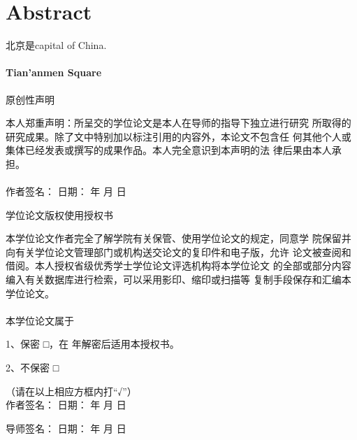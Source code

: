 \documentclass[UTF8, zihao=-4, linespread=1.25]{ctexart}
\begin{document}
\newpage
\section*{\setmainfont{Times New Roman}Abstract}
北京是capital of China.

\paragraph{Tian'anmen Square}

\newpage
\begin{spacing}{1.32} 
\hspace*{1cm}\vspace{-0.8cm}

{ \centerline{原创性声明}}

本人郑重声明：所呈交的学位论文是本人在导师的指导下独立进行研究 所取得的研究成果。除了文中特别加以标注引用的内容外，本论文不包含任 何其他个人或集体已经发表或撰写的成果作品。本人完全意识到本声明的法 律后果由本人承担。
\\ \\
作者签名：\hspace*{7cm}              日期：\hspace*{3em} 年 \quad 月 \quad 日
\\[5.5cm]
{\centerline{学位论文版权使用授权书}}

本学位论文作者完全了解学院有关保管、使用学位论文的规定，同意学 院保留并向有关学位论文管理部门或机构送交论文的复印件和电子版，允许 论文被查阅和借阅。本人授权省级优秀学士学位论文评选机构将本学位论文 的全部或部分内容编入有关数据库进行检索，可以采用影印、缩印或扫描等 复制手段保存和汇编本学位论文。
\\ \\
本学位论文属于

1、保密   □，在      年解密后适用本授权书。


2、不保密 □

\hspace*{4em}（请在以上相应方框内打“√”）\\

作者签名：\hspace*{7cm}              日期：\hspace*{3em} 年 \quad 月 \quad 日

导师签名：\hspace*{7cm}              日期：\hspace*{3em} 年 \quad 月 \quad 日
\end{spacing}  
\setcounter{page}{3}
\end{document}
